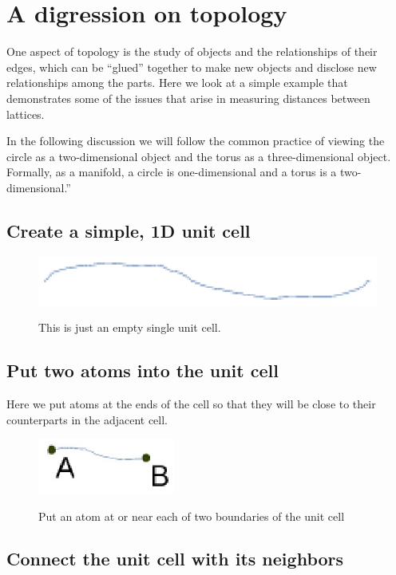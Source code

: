 \documentclass[preprint]{iucr}              %
\numberwithin{equation}{section}
\begin{document}
\section{A digression on topology}
\label{topology}

One aspect of topology is the study of objects and the relationships
of their edges, which can be ``glued'' together to make new objects
and disclose new relationships among the parts. Here we look at a simple 
example that demonstrates some of the issues that arise
in measuring distances between lattices.

In the following discussion we will follow the common practice of viewing the circle as a two-dimensional object and the torus as a three-dimensional object.   Formally, as a manifold, a circle is one-dimensional and a torus is a two-dimensional.”

\subsection{Create a simple, 1D unit cell}
	
\begin{figure}
	\includegraphics[width=\textwidth]{line_1}
	\label{line_1}
	\caption{This is just an empty single unit cell.}
\end{figure}

\subsection{Put two atoms into the unit cell}
	
	Here we put atoms at the ends of the cell so that they
	will be close to their counterparts in the adjacent cell.
\begin{figure}
	\includegraphics[width=0.4\textwidth]{line_2a}
	\label{line_2}
	\caption{Put an atom at or near each of two boundaries of the unit cell}
\end{figure}

\subsection{Connect the unit cell with its neighbors}
	
\end{document}
